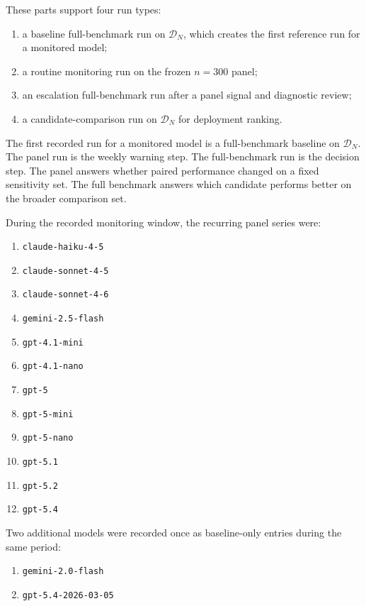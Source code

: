 These parts support four run types:
\begin{enumerate}
    \item a baseline full-benchmark run on \(\mathcal{D}_N\),
    which creates the first reference run for a monitored model;
    \item a routine monitoring run on the frozen \(n=300\) panel;
    \item an escalation full-benchmark run after a panel signal and diagnostic review;
    \item a candidate-comparison run on \(\mathcal{D}_N\) for deployment ranking.
\end{enumerate}

The first recorded run for a monitored model is a full-benchmark baseline on \(\mathcal{D}_N\).
The panel run is the weekly warning step.
The full-benchmark run is the decision step.
The panel answers whether paired performance changed on a fixed sensitivity set.
The full benchmark answers which candidate performs better on the broader comparison set.

During the recorded monitoring window, the recurring panel series were:
\begin{enumerate}
    \item \texttt{claude-haiku-4-5}
    \item \texttt{claude-sonnet-4-5}
    \item \texttt{claude-sonnet-4-6}
    \item \texttt{gemini-2.5-flash}
    \item \texttt{gpt-4.1-mini}
    \item \texttt{gpt-4.1-nano}
    \item \texttt{gpt-5}
    \item \texttt{gpt-5-mini}
    \item \texttt{gpt-5-nano}
    \item \texttt{gpt-5.1}
    \item \texttt{gpt-5.2}
    \item \texttt{gpt-5.4}
\end{enumerate}
Two additional models were recorded once as baseline-only entries
during the same period:
\begin{enumerate}
    \item \texttt{gemini-2.0-flash}
    \item \texttt{gpt-5.4-2026-03-05}
\end{enumerate}

